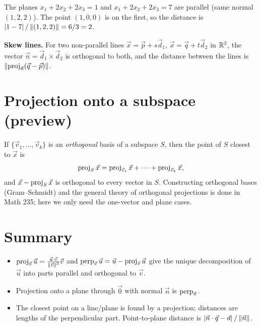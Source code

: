\begin{example}
The planes $x_1+2x_2+2x_3=1$ and $x_1+2x_2+2x_3=7$ are parallel (same normal $(1,2,2)$).
The point $(1,0,0)$ is on the first, so the distance is $\left\lvert 1-7 \right\rvert/\left\lVert (1,2,2) \right\rVert = 6/3 = 2$.
\end{example}

\begin{aside}
\textbf{Skew lines.} For two non-parallel lines $\vec x=\vec p+s\vec d_1$, $\vec x=\vec q+t\vec d_2$
in $\mathbb{R}^3$, the vector $\vec n=\vec d_1\times\vec d_2$ is orthogonal to both, and the distance
between the lines is $\left\lVert \operatorname{proj}_{\vec n}(\vec q-\vec p) \right\rVert$.
\end{aside}

\section{Projection onto a subspace (preview)}

If $\{\vec v_1,\dots,\vec v_k\}$ is an \emph{orthogonal} basis of a subspace $S$, then the point of $S$
closest to $\vec x$ is
\[
  \operatorname{proj}_S\vec x = \operatorname{proj}_{\vec v_1}\vec x+\dots+\operatorname{proj}_{\vec v_k}\vec x,
\]
and $\vec x - \operatorname{proj}_S\vec x$ is orthogonal to every vector in $S$. Constructing orthogonal bases
(Gram--Schmidt) and the general theory of orthogonal projections is done in Math 235;
here we only need the one-vector and plane cases.

\section*{Summary}
\begin{itemize}
  \item $\operatorname{proj}_{\vec v}\vec u = \frac{\vec u\cdot\vec v}{\left\lVert \vec v \right\rVert^2}\vec v$ and
        $\operatorname{perp}_{\vec v}\vec u=\vec u-\operatorname{proj}_{\vec v}\vec u$ give the unique decomposition of $\vec u$
        into parts parallel and orthogonal to $\vec v$.
  \item Projection onto a plane through $\vec 0$ with normal $\vec n$ is $\operatorname{perp}_{\vec n}$.
  \item The closest point on a line/plane is found by a projection; distances are lengths of
        the perpendicular part. Point-to-plane distance is $\left\lvert \vec n\cdot\vec q-d \right\rvert/\left\lVert \vec n \right\rVert$.
\end{itemize}
